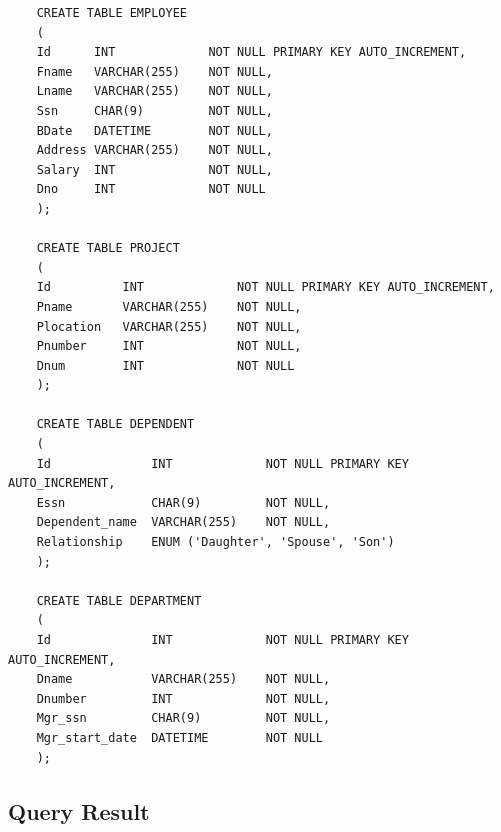 \documentclass[12pt,titlepage]{article}
\begin{document}
\begin{verbatim}
    CREATE TABLE EMPLOYEE
    (
    Id      INT             NOT NULL PRIMARY KEY AUTO_INCREMENT,
    Fname   VARCHAR(255)    NOT NULL,
    Lname   VARCHAR(255)    NOT NULL,
    Ssn     CHAR(9)         NOT NULL,
    BDate   DATETIME        NOT NULL,
    Address VARCHAR(255)    NOT NULL,
    Salary  INT             NOT NULL,
    Dno     INT             NOT NULL
    );

    CREATE TABLE PROJECT
    (
    Id          INT             NOT NULL PRIMARY KEY AUTO_INCREMENT,
    Pname       VARCHAR(255)    NOT NULL,
    Plocation   VARCHAR(255)    NOT NULL,
    Pnumber     INT             NOT NULL,
    Dnum        INT             NOT NULL
    );

    CREATE TABLE DEPENDENT
    (
    Id              INT             NOT NULL PRIMARY KEY AUTO_INCREMENT,
    Essn            CHAR(9)         NOT NULL,
    Dependent_name  VARCHAR(255)    NOT NULL,
    Relationship    ENUM ('Daughter', 'Spouse', 'Son')
    );

    CREATE TABLE DEPARTMENT
    (
    Id              INT             NOT NULL PRIMARY KEY AUTO_INCREMENT,
    Dname           VARCHAR(255)    NOT NULL,
    Dnumber         INT             NOT NULL,
    Mgr_ssn         CHAR(9)         NOT NULL,
    Mgr_start_date  DATETIME        NOT NULL
    );
\end{verbatim}

\subsection*{Query Result}
\end{document}
